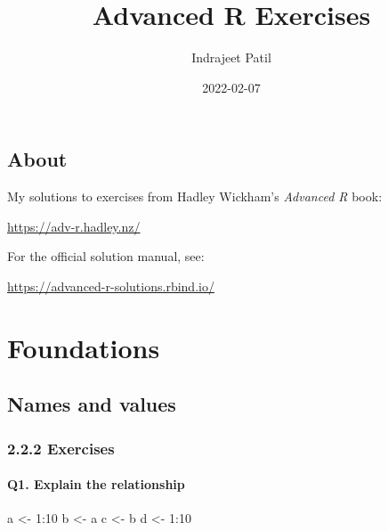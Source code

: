 \documentclass[
]{book}
\title{Advanced R Exercises}
\author{Indrajeet Patil}
\date{2022-02-07}
\newenvironment{Shaded}{\begin{snugshade}}{\end{snugshade}}
\newcommand{\DecValTok}[1]{\textcolor[rgb]{0.00,0.00,0.81}{#1}}
\newcommand{\NormalTok}[1]{#1}
\newcommand{\OtherTok}[1]{\textcolor[rgb]{0.56,0.35,0.01}{#1}}
\newcommand{\SpecialCharTok}[1]{\textcolor[rgb]{0.00,0.00,0.00}{#1}}
\begin{document}
\maketitle

{
\setcounter{tocdepth}{1}
\tableofcontents
}
\hypertarget{about}{%
\chapter*{About}\label{about}}

My solutions to exercises from Hadley Wickham's \emph{Advanced R} book:

\url{https://adv-r.hadley.nz/}

For the official solution manual, see:

\url{https://advanced-r-solutions.rbind.io/}

\hypertarget{part-foundations}{%
\part{Foundations}\label{part-foundations}}

\hypertarget{names-and-values}{%
\chapter{Names and values}\label{names-and-values}}

\hypertarget{exercises}{%
\section{2.2.2 Exercises}\label{exercises}}

\hypertarget{q1.-explain-the-relationship}{%
\subsection*{Q1. Explain the relationship}\label{q1.-explain-the-relationship}}

\begin{Shaded}
\begin{Highlighting}[]
\NormalTok{a }\OtherTok{\textless{}{-}} \DecValTok{1}\SpecialCharTok{:}\DecValTok{10}
\NormalTok{b }\OtherTok{\textless{}{-}}\NormalTok{ a}
\NormalTok{c }\OtherTok{\textless{}{-}}\NormalTok{ b}
\NormalTok{d }\OtherTok{\textless{}{-}} \DecValTok{1}\SpecialCharTok{:}\DecValTok{10}
\end{Highlighting}
\end{Shaded}
\end{document}

